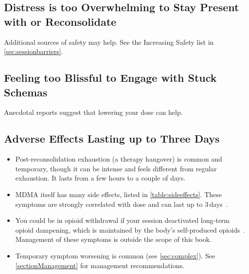 \documentclass[11pt,oneside]{book}
\let\cite\parencite
\begin{document}
\subsection{Distress is too Overwhelming to Stay Present with or Reconsolidate}
Additional sources of safety may help. See the Increasing Safety list in \cref{sec:sessionbarriers}.

\subsection{Feeling too Blissful to Engage with Stuck Schemas}
Anecdotal reports suggest that lowering your dose can help.

\subsection{Adverse Effects Lasting up to Three Days}
\begin{itemize}
    \item Post-reconsolidation exhaustion (a therapy hangover) is common and temporary, though it can be intense and feels different from regular exhaustion. It lasts from a few hours to a couple of days.
    \item MDMA itself has many side effects, listed in \cref{table:sideeffects}. These symptoms are strongly correlated with dose and can last up to 3\,days~\cite{liechtiGender}.
    \item You could be in opioid withdrawal if your session deactivated long-term opioid dampening, which is maintained by the body's self-produced opioids~\cite{laniusNeurobiology}. Management of these symptoms is outside the scope of this book.
    \item Temporary symptom worsening is common (see \cref{sec:complex}). See \cref{sectionManagement} for management recommendations.
\end{itemize}
\end{document}
